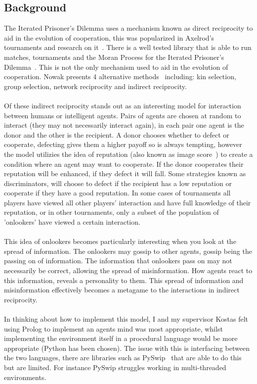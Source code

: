 \documentclass{article}
\begin{document}
\subsection*{Background}
The Iterated Prisoner's Dilemma uses a mechanism known as direct reciprocity to aid in the evolution of cooperation, this was popularized in Axelrod's tournaments and research on it~\cite{evolution_of_cooperation}. There is a well tested library that is able to run matches, tournaments and the Moran Process for the Iterated Prisoner's Dilemma~\cite{axelrodproject}. This is not the only mechanism used to aid in the evolution of cooperation. Nowak presents 4 alternative methods~\cite{five_rules_coop} including: kin selection, group selection, network reciprocity and indirect reciprocity.\\\\
Of these indirect reciprocity stands out as an interesting model for interaction between humans or intelligent agents. Pairs of agents are chosen at random to interact (they may not necessarily interact again), in each pair one agent is the donor and the other is the recipient. A donor chooses whether to defect or cooperate, defecting gives them a higher payoff so is always tempting, however the model utilizies the idea of reputation (also known as image score~\cite{evol_indirect_image}) to create a condition where an agent may want to cooperate. If the donor cooperates their reputation will be enhanced, if they defect it will fall. Some strategies known as discriminators, will choose to defect if the recipient has a low reputation or cooperate if they have a good reputation. In some cases of tournaments all players have viewed all other players' interaction and have full knowledge of their reputation, or in other tournaments, only a subset of the population of 'onlookers' have viewed a certain interaction.\\\\
This idea of onlookers becomes particularly interesting when you look at the spread of information. The onlookers may gossip to other agents, gossip being the passing on of information. The information that onlookers pass on may not necessarily be correct, allowing the spread of misinformation. How agents react to this information, reveals a personality to them. This spread of information and misinformation effectively becomes a metagame to the interactions in indirect reciprocity.\\\\
In thinking about how to implement this model, I and my supervisor Kostas felt using Prolog to implement an agents mind was most appropriate, whilst implementing the environment itself in a procedural language would be more appropriate (Python has been chosen). The issue with this is interfacing between the two languages, there are libraries such as PySwip~\cite{pyswip} that are able to do this but are limited. For instance PySwip struggles working in multi-threaded environments.
\end{document}
